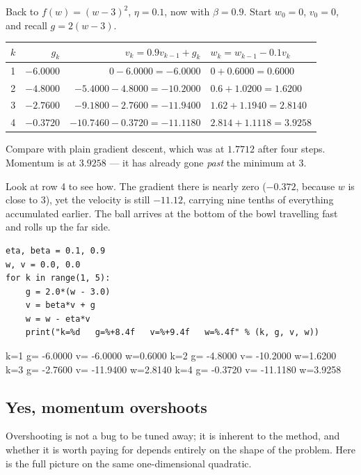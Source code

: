 \documentclass[11pt]{article}
\begin{document}
\begin{worked}
Back to $f(w) = (w-3)^2$, $\eta = 0.1$, now with $\beta = 0.9$. Start
$w_0 = 0$, $v_0 = 0$, and recall $g = 2(w-3)$.

\begin{center}
\begin{tabular}{@{}rrrl@{}}
\toprule
$k$ & $g_k$ & $v_k = 0.9 v_{k-1} + g_k$ & $w_k = w_{k-1} - 0.1 v_k$\\
\midrule
1 & $-6.0000$ & $0 - 6.0000 = -6.0000$              & $0 + 0.6000 = 0.6000$\\
2 & $-4.8000$ & $-5.4000 - 4.8000 = -10.2000$       & $0.6 + 1.0200 = 1.6200$\\
3 & $-2.7600$ & $-9.1800 - 2.7600 = -11.9400$       & $1.62 + 1.1940 = 2.8140$\\
4 & $-0.3720$ & $-10.7460 - 0.3720 = -11.1180$      & $2.814 + 1.1118 = \mathbf{3.9258}$\\
\bottomrule
\end{tabular}
\end{center}

Compare with plain gradient descent, which was at $1.7712$ after four steps.
Momentum is at $3.9258$ --- it has already gone \emph{past} the minimum at $3$.

Look at row 4 to see how. The gradient there is nearly zero ($-0.372$, because
$w$ is close to $3$), yet the velocity is still $-11.12$, carrying nine tenths
of everything accumulated earlier. The ball arrives at the bottom of the bowl
travelling fast and rolls up the far side.
\end{worked}

\begin{lstlisting}
eta, beta = 0.1, 0.9
w, v = 0.0, 0.0
for k in range(1, 5):
    g = 2.0*(w - 3.0)
    v = beta*v + g
    w = w - eta*v
    print("k=%d   g=%+8.4f   v=%+9.4f   w=%.4f" % (k, g, v, w))
\end{lstlisting}
\begin{codeout}
k=1   g= -6.0000   v=  -6.0000   w=0.6000
k=2   g= -4.8000   v= -10.2000   w=1.6200
k=3   g= -2.7600   v= -11.9400   w=2.8140
k=4   g= -0.3720   v= -11.1180   w=3.9258
\end{codeout}

\subsection{Yes, momentum overshoots}

Overshooting is not a bug to be tuned away; it is inherent to the method, and
whether it is worth paying for depends entirely on the shape of the problem.
Here is the full picture on the same one-dimensional quadratic.
\end{document}
